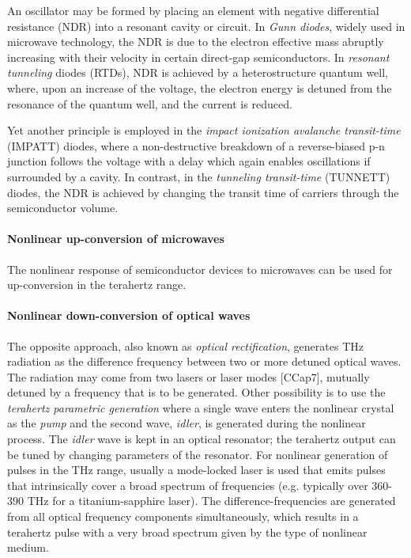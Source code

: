 An oscillator may be formed by placing an element with negative differential resistance (NDR) into a resonant cavity or circuit. 
In \textit{Gunn diodes}, widely used in microwave technology, the NDR is due to the electron effective mass abruptly increasing with their velocity in certain direct-gap semiconductors.
In \textit{resonant tunneling} diodes (RTDs)\cite{asada2008resonant,brown1991oscillations}, NDR is achieved by a heterostructure quantum well, where, upon an increase of the voltage, the electron energy is detuned from the resonance of the quantum well, and the current is reduced.

Yet another principle is employed in the \textit{impact ionization avalanche transit-time} (IMPATT) diodes, where a non-destructive breakdown of a reverse-biased p-n junction follows the voltage with a delay which again enables oscillations if surrounded by a cavity. 
In contrast, in the \textit{tunneling transit-time} (TUNNETT) diodes, the NDR is achieved by changing the transit time of carriers through the semiconductor volume.
\paragraph{Nonlinear up-conversion of microwaves}%
The nonlinear response of semiconductor devices to microwaves can be used for up-conversion in the terahertz range. 

\paragraph{Nonlinear down-conversion of optical waves}%
The opposite approach, also known as \textit{optical rectification}, generates THz radiation as the difference frequency between two or more detuned optical waves.
The radiation may come from two lasers or laser modes [CCap7], mutually detuned by a frequency that is to be generated. %
Other possibility is to use the \textit{terahertz parametric generation} where a single wave enters the nonlinear crystal as the \textit{pump} and the second wave, \textit{idler}, is generated during the nonlinear process. The \textit{idler} wave is kept in an optical resonator; the terahertz output can be tuned by changing parameters of the resonator. 
For nonlinear generation of pulses in the THz range, usually a mode-locked laser is used that emits pulses that intrinsically cover a broad spectrum of frequencies (e.g. typically over 360-390 THz for a titanium-sapphire laser). The difference-frequencies are generated from all optical frequency components simultaneously, which results in a terahertz pulse with a very broad spectrum given by the type of nonlinear medium. 

